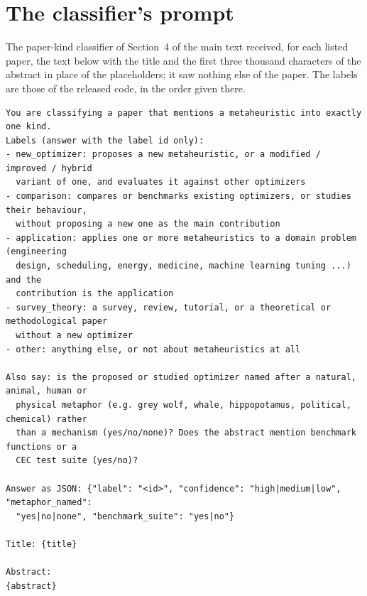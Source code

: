 \documentclass[preprint,review,12pt]{elsarticle}
\begin{document}
\section{The classifier's prompt}
\label{app:prompt}

The paper-kind classifier of Section~4 of the main text received, for each listed paper, the text below with the title and the first three thousand characters of the abstract in place of the placeholders; it saw nothing else of the paper. The labels are those of the released code, in the order given there.

\begin{footnotesize}
\begin{verbatim}
You are classifying a paper that mentions a metaheuristic into exactly one kind.
Labels (answer with the label id only):
- new_optimizer: proposes a new metaheuristic, or a modified / improved / hybrid
  variant of one, and evaluates it against other optimizers
- comparison: compares or benchmarks existing optimizers, or studies their behaviour,
  without proposing a new one as the main contribution
- application: applies one or more metaheuristics to a domain problem (engineering
  design, scheduling, energy, medicine, machine learning tuning ...) and the
  contribution is the application
- survey_theory: a survey, review, tutorial, or a theoretical or methodological paper
  without a new optimizer
- other: anything else, or not about metaheuristics at all

Also say: is the proposed or studied optimizer named after a natural, animal, human or
  physical metaphor (e.g. grey wolf, whale, hippopotamus, political, chemical) rather
  than a mechanism (yes/no/none)? Does the abstract mention benchmark functions or a
  CEC test suite (yes/no)?

Answer as JSON: {"label": "<id>", "confidence": "high|medium|low", "metaphor_named":
  "yes|no|none", "benchmark_suite": "yes|no"}

Title: {title}

Abstract:
{abstract}
\end{verbatim}
\end{footnotesize}




\end{document}
